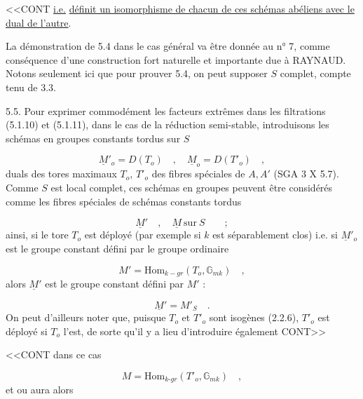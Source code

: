 
<<CONT \underline{i.e.} \underline{définit un isomorphisme de chacun de ces schémas abéliens avec le dual de l'autre}.

La démonstration de 5.4 dans le cas général va être donnée au n° 7, comme conséquence d'une construction fort naturelle et importante due à RAYNAUD. Notons seulement ici que pour prouver 5.4, on peut supposer $S$ complet, compte tenu de 3.3.

5.5. Pour exprimer commodément les facteurs extrêmes dans les filtrations (5.1.10) et (5.1.11), dans le cas de la réduction semi-stable, introduisons les schémas en groupes constants tordus sur $S$

\begin{equation}\tag{5.5.1}
\underline{M}'_o = D(T_o) \quad , \quad \underline{M}_o = D(T'_o) \quad ,
\end{equation}
duals des tores maximaux $T_o$, $T'_o$ des fibres spéciales de $A,A'$ (SGA 3 X 5.7). Comme $S$ est local complet, ces schémas en groupes peuvent être considérés comme les fibres spéciales de schémas constants tordus

\begin{equation}\tag{5.5.2}
\underline{M}' \quad , \quad \underline{M} \ \text{sur} \ S \qquad ;
\end{equation}
ainsi, si le tore $T_o$ est déployé (par exemple si $k$ est séparablement clos) i.e. si $\underline{M}'_o$ est le groupe constant défini par le groupe ordinaire

\begin{equation}\tag{5.5.3}
M' = \mathrm{Hom}_{k-gr}(T_o,\mathbb{G}_{mk}) \quad ,
\end{equation}
alors $\underline{M}'$ est le groupe constant défini par $M'$ :

\begin{equation*}
\underline{M}' = M'_S \quad .
\end{equation*}
On peut d'ailleurs noter que, puisque $T_o$ et $T'_o$ sont isogènes (2.2.6), $T'_o$ est déployé si $T_o$ l'est, de sorte qu'il y a lieu d'introduire également CONT>>



<<CONT dans ce cas

\begin{equation}\tag{5.5.4}
M = \mathrm{Hom}_{k\text{-}gr}(T'_o, \mathbb{G}_{mk}) \quad ,
\end{equation}
et ou aura alors

